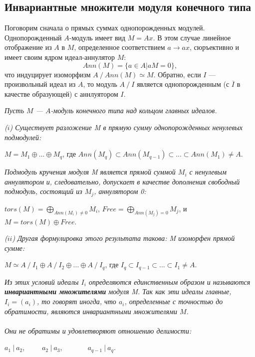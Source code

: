 \subsection{Инвариантные множители модуля конечного типа}
\noindent Поговорим сначала о прямых суммах однопорожденных модулей. Однопорожденный $A$-модуль имеет вид $M = Ax$. В этом случае линейное отображение из $A$ в $M$, определенное соответствием $a \rightarrow ax$, сюръективно и имеет своим ядром идеал-аннулятор $M$:
$$Ann(M)= \{a \in A | a M = 0\},$$
\noindent что индуцирует изоморфизм $ A ~/~ Ann(M) \simeq M$. Обратно, если $I$ — произвольный идеал из $A$, то модуль $ A ~/~ I$ является однопорожденным (с $\overline{I}$ в качестве образующей) с аннлуятором $I$.
\begin{thm}
\hspace*{0.5cm}
\textit{Пусть $M$ — $A$-модуль конечного типа над кольцом главных идеалов.}

\textit{($i$) Существует разложение M в прямую сумму однопорожденных ненулевых подмодулей:}
\begin{center}
$M = M_1 \oplus ... \oplus M_q$, где $Ann(M_q) \subset Ann(M_{q-1}) \subset ... \subset Ann(M_1) \ne A$.
\end{center}

\noindent \textit{Подмодуль кручения модуля M является прямой суммой $M_i$ с ненулевым аннулятором и, следовательно, допускает в качестве дополнения свободный подмодуль, состоящий из $M_j$, аннулятором 0:}
\begin{center}
$tors(M) = \bigoplus _{Ann(M_i) \ne 0} M_i$,
$Free = \bigoplus _{Ann(M_j) = 0} M_j$, и 
$M = tors(M) \oplus Free$.
\end{center}

\textit{($ii$) Другая формулировка этого результата такова: M изоморфен прямой сумме:}
\begin{center}
$ M \simeq A ~/~ I_1 \oplus A ~/~ I_2 \oplus ... \oplus A ~/~ I_q $, 
где $I_q \subset I_{q-1} \subset ... \subset I_1 \ne A$.
\end{center}

\textit{ Из этих условий идеалы $I_i$ определяются единственным образом и называются \textbf{инвариантными множителями} модуля M. Так как эти идеалы главные, $I_i = (a_i)$, то говорят иногда, что $a_i$, определенные с точностью до обратимости, являются инвариантными множителями $M$.}
\textit{\\\\Они не обратимы и удовлетворяют отношению делимости:}
\begin{center}
$a_1~|~a_2$,~~~~~$a_2~|~a_3$, ~~~~~~ $a_{q-1}~|~a_q$.
\end{center}
\end{thm}
